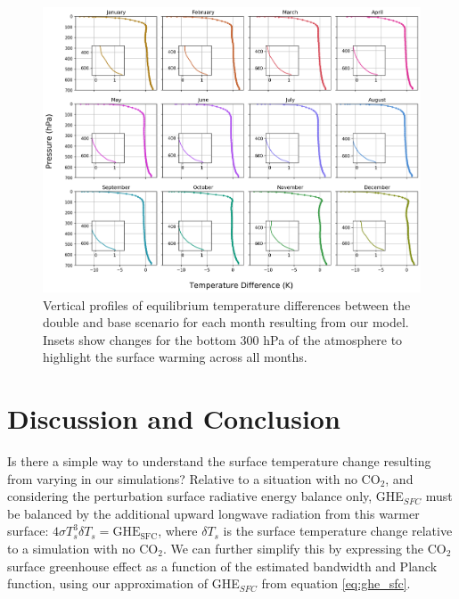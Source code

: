 \documentclass[draft]{agujournal2019}
\begin{document}
\begin{figure}[htb!]
\noindent\includegraphics[width=1\textwidth]{figures/temp_dif.png}
\centering
\caption{Vertical profiles of equilibrium temperature differences between the double and base  scenario for each month resulting from our model. Insets show changes for the bottom 300 hPa of the atmosphere to highlight the surface warming across all months.}
\label{fig:temp_dif}
\end{figure}


\section{Discussion and Conclusion}\label{section:discussion} 
%

Is there a simple way to understand the surface temperature change resulting from varying  in our simulations? Relative to a situation with no CO$_2$, and considering the perturbation surface radiative energy balance only, GHE$_{SFC}$ must be balanced by the additional upward longwave radiation from this warmer surface: $ 4 \sigma T_s^3 \delta T_s = \text{GHE}_{\text{SFC}}$, where $\delta T_s$ is the surface temperature change relative to a simulation with no CO$_2$. We can further simplify this by expressing the CO$_2$ surface greenhouse effect as a function of the estimated bandwidth and Planck function, using our approximation of GHE$_{SFC}$ from equation \ref{eq:ghe_sfc}.
\end{document}
